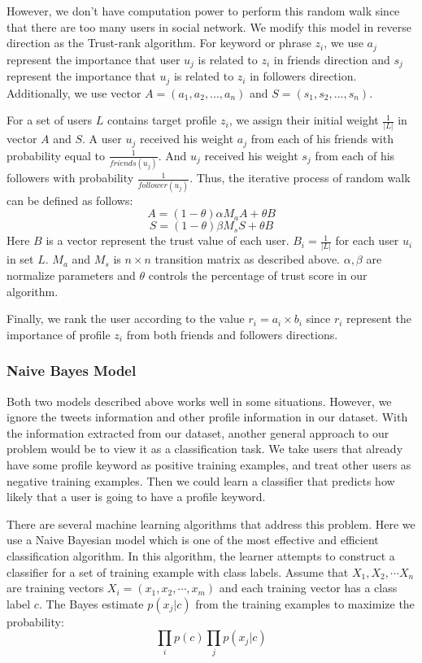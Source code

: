 \documentclass{article}
\begin{document}
However, we don't have computation power to perform this random walk since that there are too many users in social network. We modify this model in reverse direction as the Trust-rank algorithm. For keyword or phrase $z_i$, we use $a_j$ represent the importance that user $u_j$ is related to $z_i$ in friends direction and $s_j$ represent the importance that $u_j$ is related to $z_i$ in followers direction. Additionally, we use vector $A=(a_1, a_2, ..., a_n)$ and $S=(s_1, s_2, ..., s_n)$.

For a set of users $L$ contains target profile $z_i$, we assign their initial weight $\frac{1}{|L|}$ in vector $A$ and $S$. A user $u_j$ received his weight $a_j$ from each of his friends with probability equal to $\frac{1}{friends(u_j)}$. And $u_j$ received his weight $s_j$ from each of his followers with probability $\frac{1}{follower(u_j)}$. Thus, the iterative process of random walk can be defined as follows:
$$A = (1 - \theta)\alpha M_a A + \theta B$$
$$S = (1 - \theta)\beta M_s S + \theta B$$
Here $B$ is a vector represent the trust value of each user. $B_i = \frac{1}{|L|}$ for each user $u_i$ in set $L$. $M_a$ and $M_s$ is $n \times n$ transition matrix as described above. $\alpha, \beta$ are normalize parameters and $\theta$ controls the percentage of trust score in our algorithm.

Finally, we rank the user according to the value $r_i=a_i \times b_i$ since $r_i$ represent the importance of profile $z_i$ from both friends and followers directions.

\subsubsection{Naive Bayes Model}
Both two models described above works well in some situations. However, we ignore the tweets information and other profile information in our dataset. With the information extracted from our dataset, another general approach to our problem would be to view it as a classification task. We take users that already have some profile keyword as positive training examples, and treat other users as negative training examples. Then we could learn a classifier that predicts how likely that a user is going to have a profile keyword.

There are several machine learning algorithms that address this problem. Here we use a Naive Bayesian model which is one of the most effective and efficient classification algorithm. In this algorithm, the learner attempts to construct a classifier for a set of training example with class labels. Assume that $X_1, X_2, \cdots X_n$ are training vectors $X_i=(x_1, x_2, \cdots, x_m)$ and each training vector has a class label $c$. The Bayes estimate $p(x_j|c)$ from the training examples to maximize the probability:
$$\prod_i p(c)\prod_jp(x_j|c)$$
\end{document}
